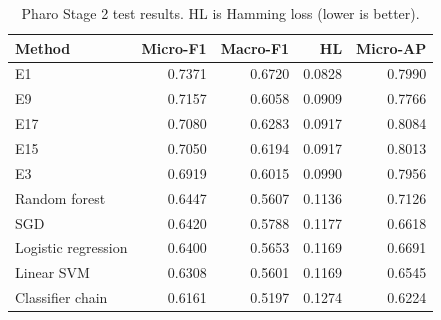 \begin{table}[htbp]
\centering\small
\caption{Pharo Stage 2 test results. HL is Hamming loss (lower is better).}\label{tab:pharotest}
\begin{tabular}{lrrrr}\toprule
Method & Micro-F1 & Macro-F1 & HL & Micro-AP\\\midrule
E1 & 0.7371 & 0.6720 & 0.0828 & 0.7990\\
E9 & 0.7157 & 0.6058 & 0.0909 & 0.7766\\
E17 & 0.7080 & 0.6283 & 0.0917 & 0.8084\\
E15 & 0.7050 & 0.6194 & 0.0917 & 0.8013\\
E3 & 0.6919 & 0.6015 & 0.0990 & 0.7956\\
Random forest & 0.6447 & 0.5607 & 0.1136 & 0.7126\\
SGD & 0.6420 & 0.5788 & 0.1177 & 0.6618\\
Logistic regression & 0.6400 & 0.5653 & 0.1169 & 0.6691\\
Linear SVM & 0.6308 & 0.5601 & 0.1169 & 0.6545\\
Classifier chain & 0.6161 & 0.5197 & 0.1274 & 0.6224\\
\bottomrule\end{tabular}
\end{table}
